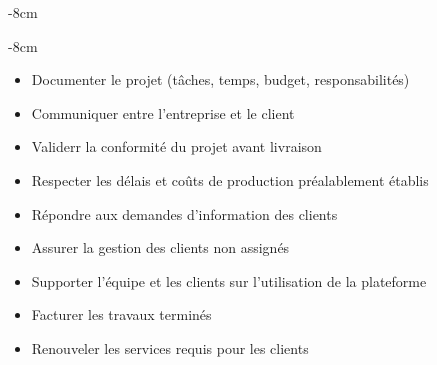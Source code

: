 \documentclass[10pt,a4paper]{altacv}
\begin{document}

\begin{adjustwidth}{}{-8cm}
\makecvheader
\end{adjustwidth}
\begin{adjustwidth}{}{-8cm}

\end{adjustwidth}

\begin{itemize}
\item Documenter le projet (tâches, temps, budget, responsabilités)
\item Communiquer entre l’entreprise et le client
\item Validerr la conformité du projet avant livraison
\item Respecter les délais et coûts de production préalablement établis
\item Répondre aux demandes d’information des clients
\item Assurer la gestion des clients non assignés
\item Supporter l’équipe et les clients sur l’utilisation de la plateforme
\item Facturer les travaux terminés
\item Renouveler les services requis pour les clients
\end{itemize}
\end{document}
